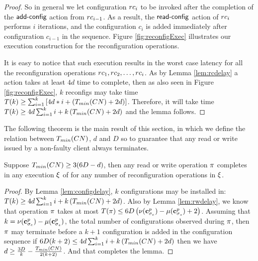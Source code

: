 \begin{proof}
So in general we let configuration $rc_i$ to be invoked after the completion of 
the $\act{add-config}$ action from $rc_{i-1}$. As a result, the $\act{read-config}$
action of $rc_i$ performs $i$ iterations, and the configuration $c_i$ is added 
immediately after configuration $c_{i-1}$ in the sequence. Figure \ref{fig:reconfigExec}
illustrates our execution construction for the reconfiguration operations. 

It is easy to notice that such execution results in the worst case latency for all the 
reconfiguration operations $rc_1, rc_2,\ldots, rc_i$. As by Lemma \ref{lem:rcdelay}
a  action takes at least $4d$ time to complete, then as also 
seen in Figure \ref{fig:reconfigExec}, $k$ reconfigs may take time 
$T(k) \geq \sum_{i=1}^{k}\left[4d*i+ \left(T_{min}(CN)+2d\right)\right]$. Therefore, it will take time
$T(k) \geq 4d\sum_{i=1}^{k}i+ k\left(T_{min}(CN)+2d\right)$ and the lemma follows.
%
\end{proof}

The following theorem is the main result of this section, in which we define the relation between $T_{min}(CN)$, $d$ and $D$
so to guarantee that any read or write issued by a non-faulty client always terminates.

\begin{theorem}
 Suppose  $T_{min}(CN) \geq 3(6D-d)$, then  any  read or write operation $\pi$ completes in any execution  $\EX$ of 
\ares{}  for any number of reconfiguration operations in $\EX$.
\end{theorem}

\begin{proof}
	By Lemma \ref{lem:configdelay}, 
	$k$ configurations may be installed in:
		$T(k) \geq 4d\sum_{i=1}^{k}i+ k\left(T_{min}(CN)+2d\right)$.	
	Also by Lemma \ref{lem:rwdelay}, we know that operation $\pi$ takes at most 
$	T(\pi)\leq 6D\left(\nu(\mathbf{c}^{p}_{\sigma_e}) - \mu(\mathbf{c}^{p}_{\sigma_s})+2\right)$.
	Assuming that $k=\nu(\mathbf{c}^{p}_{\sigma_e}) - \mu(\mathbf{c}^{p}_{\sigma_s})$, the total number of 
	configurations observed during $\pi$, then $\pi$ may terminate before a $k+1$ configuration 
	is added in the configuration sequence if 
	  $6D(k+2) \leq  4d\sum_{i=1}^{k}i+ k\left(T_{min}(CN)+2d\right)$ then we have
	  $d \geq \frac{3D}{k}-\frac{T_{min}(CN)}{2(k+2)}$.
	And that completes the lemma. 
\end{proof}

